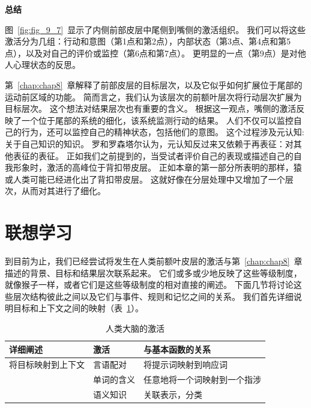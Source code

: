 \textbf{总结}
\par
图~\ref{fig:fig_9_7}~显示了内侧前部皮层中尾侧到嘴侧的激活组织。
我们可以将这些激活分为几组：行动和意图（第1点和第2点），内部状态（第3点、第4点和第5点），以及对自己的评价或监控（第6点和第7点）。
更明显的一点（第9点）是对他人心理状态的反思。
\par


第~\ref{chap:chap8}~章解释了前部皮层的目标层次，以及它似乎如何扩展位于尾部的运动前区域的功能。
简而言之，我们认为该层次的前额叶层次将行动层次扩展为目标层次。
这个想法对结果层次也有重要的含义。
根据这一观点，嘴侧的激活反映了一个位于尾部的系统的细化，该系统监测行动的结果。
人们不仅可以监控自己的行为，还可以监控自己的精神状态，包括他们的意图。
这个过程涉及元认知:关于自己知识的知识。
罗和罗森塔尔\cite{lau2011empirical}认为，元认知反过来又依赖于再表征：对其他表征的表征。
正如我们之前提到的，当受试者评价自己的表现或描述自己的自我形象时，激活的高峰位于背扣带皮层。
正如本章的第一部分所表明的那样，猿或人类可能已经进化出了背扣带皮层。
这就好像在分层处理中又增加了一个层次，从而对其进行了细化。



\section{联想学习}
\par

到目前为止，我们已经尝试将发生在人类前额叶皮层的激活与第~\ref{chap:chap8}~章描述的背景、目标和结果层次联系起来。
它们或多或少地反映了这些等级制度，就像猴子一样，或者它们是这些等级制度的相对直接的阐述。
下面几节将讨论这些层次结构彼此之间以及它们与事件、规则和记忆之间的关系。
我们首先详细说明目标和上下文之间的映射（表~\ref{tab:9_6}）。


\begin{table}[htbp] 
	\newcommand{\tabincell}[2]{\begin{tabular}{@{}#1@{}}#2\end{tabular}} %
	\centering
	\caption{人类大脑的激活\label{tab:9_6}}
	\renewcommand\arraystretch{1.5}	%
	\begin{tabular}{lll}
		\toprule
		详细阐述 & 激活 & 与基本函数的关系\\
		\midrule
		将目标映射到上下文 & 言语配对 & 将提示词映射到响应词  \\
		& 单词的含义 & 任意地将一个词映射到一个指涉 \\
		& 语义知识 & 关联表示，分类 \\
		\bottomrule
		
	\end{tabular}%
\end{table}%



